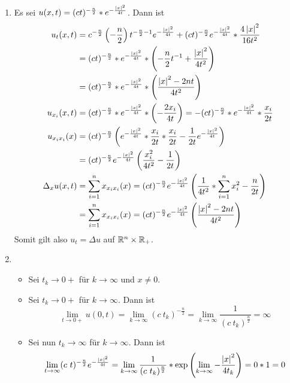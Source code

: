 \begin{exercisePage}
	\begin{enumerate}[label=(zu \alph*), leftmargin=*]
		\item Es sei $u(x,t) = (ct)^{-\frac{n}{2}} * e^{- \frac{\left| x \right|^2}{4t}}$. Dann ist
		\begin{align*}
			u_t(x, t) &= c^{-\frac{n}{2}} \left( - \frac{n}{2} \right) t^{-\frac{n}{2} - 1} e^{-\frac{\left| x \right|^2}{4t}} + (ct)^{-\frac{n}{2}} e^{- \frac{\left| x \right|^2}{4t}} * \frac{4 \left| x \right|^2}{16 t^2} \\
			&= (ct)^{-\frac{n}{2}} * e^{- \frac{\left| x \right|^2}{4t}} * \left( - \frac{n}{2} t^{-1} + \frac{\left| x \right|^2}{4t^2} \right) \\
			&= (ct)^{-\frac{n}{2}} * e^{- \frac{\left| x \right|^2}{4t}} * \left( \frac{\left| x \right|^2 - 2nt}{4t^2} \right) \\
			u_{x_i}(x,t) &= (ct)^{-\frac{n}{2}} * e^{- \frac{\left| x \right|^2}{4t}} * \left( -\frac{2x_i}{4t} \right) = - (ct)^{-\frac{n}{2}} * e^{- \frac{\left| x \right|^2}{4t}} * \frac{x_i}{2t} \\
			u_{x_i x_i}(x) &= (ct)^{-\frac{n}{2}} \left( e^{- \frac{\left| x \right|^2}{4t}} * \frac{x_i}{2t} * \frac{x_i}{2t} - \frac{1}{2t} e^{- \frac{\left| x \right|^2}{4t}} \right) \\
			&= (ct)^{-\frac{n}{2}} e^{- \frac{\left| x \right|^2}{4t}} \left(  \frac{x_i^2}{4t^2} - \frac{1}{2t} \right) \\
			\Delta_x u(x,t) &= \sum_{i=1}^n x_{x_i x_i}(x)  
			= (ct)^{-\frac{n}{2}} e^{- \frac{\left| x \right|^2}{4t}} \left( \frac{1}{4t^2} * \sum_{i=1}^n x_i^2 - \frac{n}{2t} \right) \\
			&= \sum_{i=1}^n x_{x_i x_i}(x)  
			= (ct)^{-\frac{n}{2}} e^{- \frac{\left| x \right|^2}{4t}} \left( \frac{\left| x \right|^2 - 2nt}{4t^2} \right)
		\end{align*}
		Somit gilt also $u_t = \Delta u$ auf $\mathbb{R}^n \times \mathbb{R}_+$.
		
		\item \begin{itemize}
			\item Sei $t_k \to  0+$ für $k \to \infty$ und $x \neq 0$.
			
			\item Sei $t_k \to 0+$ für $k \to \infty$. Dann ist 
			\begin{equation*}
				\lim_{t \to 0+} u(0,t) = \lim_{k \to \infty} (c \ t_k)^{- \frac{n}{2}} = \lim_{k \to \infty} \frac{1}{(c \ t_k)^{\frac{n}{2}}} = \infty
			\end{equation*} 
			
			\item Sei nun $t_k \to \infty$ für $k \to \infty$. Dann ist
			\begin{equation*}
				\lim_{t \to \infty} (c \ t)^{- \frac{n}{2}} e^{- \frac{\left| x \right|^2}{4t}} = \lim_{k \to \infty} \frac{1}{(c \ t_k)^{\frac{n}{2}}} * \exp\left( \lim_{k \to \infty} - \frac{\left| x \right|^2}{4t_k} \right) = 0 * 1 = 0
			\end{equation*}
		\end{itemize}
		

\end{enumerate}
\end{exercisePage}
